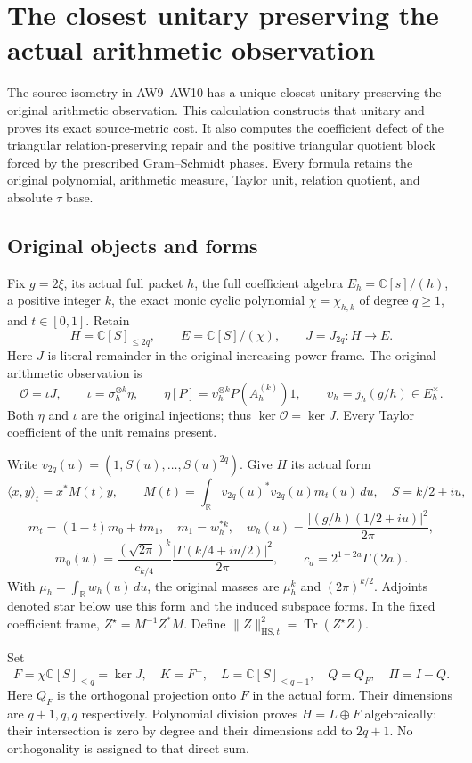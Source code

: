 \section{The closest unitary preserving the actual arithmetic observation}
\label{CFStage:sec:vr-polar-repair}

The source isometry in AW9--AW10 has a unique closest unitary preserving the original arithmetic observation. This calculation constructs that unitary and proves its exact source-metric cost. It also computes the coefficient defect of the triangular relation-preserving repair and the positive triangular quotient block forced by the prescribed Gram--Schmidt phases. Every formula retains the original polynomial, arithmetic measure, Taylor unit, relation quotient, and absolute \(\tau\) base.

\subsection{Original objects and forms}

Fix \(g=2\xi\), its actual full packet \(h\), the full coefficient algebra \(E_h=\mathbb C[s]/(h)\), a positive integer \(k\), the exact monic cyclic polynomial \(\chi=\chi_{h,k}\) of degree \(q\ge1\), and \(t\in[0,1]\). Retain
\[
 H=\mathbb C[S]_{\le2q},\qquad E=\mathbb C[S]/(\chi),\qquad
 J=J_{2q}:H\longrightarrow E.
\]
Here \(J\) is literal remainder in the original increasing-power frame. The original arithmetic observation is
\[
 \mathcal O=\iota J,\qquad \iota=\sigma_h^{\otimes k}\eta,\qquad
 \eta[P]=\upsilon_h^{\otimes k}P(A_h^{(k)})1,\qquad
 \upsilon_h=j_h(g/h)\in E_h^\times.
\]
Both \(\eta\) and \(\iota\) are the original injections; thus \(\ker\mathcal O=\ker J\). Every Taylor coefficient of the unit remains present.

Write \(v_{2q}(u)=(1,S(u),\ldots,S(u)^{2q})\). Give \(H\) its actual form
\[
 \langle x,y\rangle_t=x^*M(t)y,\qquad
 M(t)=\int_{\mathbb R}v_{2q}(u)^*v_{2q}(u)m_t(u)\,du,\quad
 S=k/2+iu,
\]
\[
 m_t=(1-t)m_0+tm_1,\quad m_1=w_h^{*k},\quad
 w_h(u)=\frac{|(g/h)(1/2+iu)|^2}{2\pi},
\]
\[
 m_0(u)=\frac{(\sqrt{2\pi})^k}{c_{k/4}}
 \frac{|\Gamma(k/4+iu/2)|^2}{2\pi},\qquad
 c_a=2^{1-2a}\Gamma(2a).
\]
With \(\mu_h=\int_{\mathbb R}w_h(u)\,du\), the original masses are \(\mu_h^k\) and \((2\pi)^{k/2}\). Adjoints denoted star below use this form and the induced subspace forms. In the fixed coefficient frame,
\(Z^\star=M^{-1}Z^*M\). Define
\(\|Z\|_{\mathrm{HS},t}^2=\operatorname{Tr}(Z^\star Z)\).

Set
\[
 F=\chi\mathbb C[S]_{\le q}=\ker J,\quad K=F^\perp,\quad
 L=\mathbb C[S]_{\le q-1},\quad Q=Q_F,\quad \Pi=I-Q.
 \tag{VR1}
\]
Here \(Q_F\) is the orthogonal projection onto \(F\) in the actual form. Their dimensions are \(q+1,q,q\) respectively. Polynomial division proves \(H=L\oplus F\) algebraically: their intersection is zero by degree and their dimensions add to \(2q+1\). No orthogonality is assigned to that direct sum.

